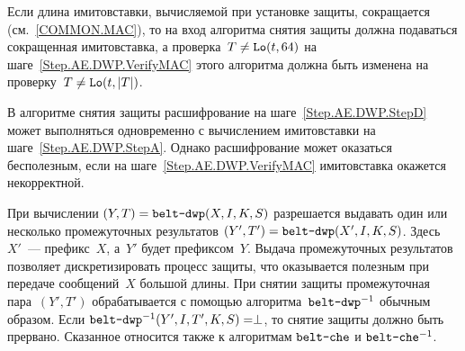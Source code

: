 \begin{note}
Если длина имитовставки, вычисляемой при установке защиты, сокращается
(см.~\ref{COMMON.MAC}), то на вход алгоритма снятия защиты должна подаваться
сокращенная имитовставка, а проверка~$T\neq\mathop{\texttt{Lo}}\nolimits(t,64)$ на
шаге~\ref{Step.AE.DWP.VerifyMAC} этого алгоритма должна быть изменена на
проверку~$T\neq\mathop{\texttt{Lo}}\nolimits(t,|T|)$.
\end{note}

\begin{note}
В алгоритме снятия защиты расшифрование на шаге~\ref{Step.AE.DWP.StepD} может
выполняться одновременно с вычислением имитовставки на
шаге~\ref{Step.AE.DWP.StepA}. Однако расшифрование может оказаться бесполезным,
если на шаге~\ref{Step.AE.DWP.VerifyMAC} имитовставка окажется некорректной.
\end{note}

\begin{note}
При вычислении $(Y,T)=\texttt{belt-dwp}(X,I,K,S)$ разрешается выдавать один 
или несколько промежуточных результатов $(Y',T')=\texttt{belt-dwp}(X',I,K,S)$.
%
Здесь~$X'$~--- префикс~$X$, а~$Y'$ будет префиксом~$Y$.
%
Выдача промежуточных результатов позволяет дискретизировать процесс защиты, 
что оказывается полезным при передаче сообщений~$X$ большой длины.
%
При снятии защиты промежуточная пара~$(Y',T')$ обрабатывается с 
помощью алгоритма~$\texttt{belt-dwp}^{-1}$ обычным образом. 
%
Если $\texttt{belt-dwp}^{-1}(Y',I,T',K,S)=\perp$, то снятие 
защиты должно быть прервано.
%
Сказанное относится также к алгоритмам $\texttt{belt-che}$ и 
$\texttt{belt-che}^{-1}$.
\end{note}

